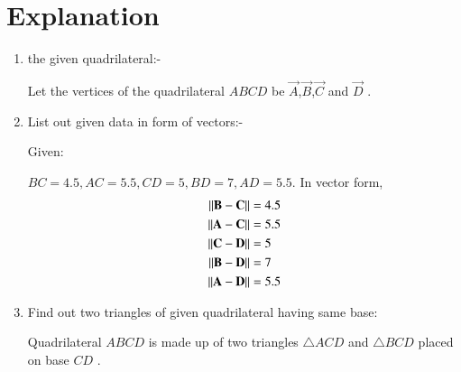 \documentclass[journal,12pt,twocolumn]{IEEEtran}
\begin{document}
\section{Explanation}
\begin{enumerate}
    \item the given quadrilateral:-
    
    Let the vertices of the quadrilateral $ABCD$ be $\vec{A}$,$\vec{B}$,$\vec{C}$ and $\vec{D}$ .
    
    \item List out given data in form of vectors:-
    
    Given:
    
    $BC =4.5,AC =5.5,CD =5,BD =7,AD=5.5$.
    In vector form,
    \begin{align}
    \left\lVert\mathbf{B}-\mathbf{C}\right\rVert &= 4.5
    \\
    \left\lVert\mathbf{A}-\mathbf{C}\right\rVert &= 5.5
    \\
    \left\lVert\mathbf{C}-\mathbf{D}\right\rVert &= 5
    \\
    \left\lVert\mathbf{B}-\mathbf{D}\right\rVert &= 7
    \\
    \left\lVert\mathbf{A}-\mathbf{D}\right\rVert &= 5.5
    \end{align}
    
    \item Find out two triangles of given quadrilateral having same base:
    
    Quadrilateral $ABCD$ is made up of two triangles $\triangle ACD$ and $\triangle BCD$ placed on base $CD$ .
    

\end{enumerate}
\end{document}
